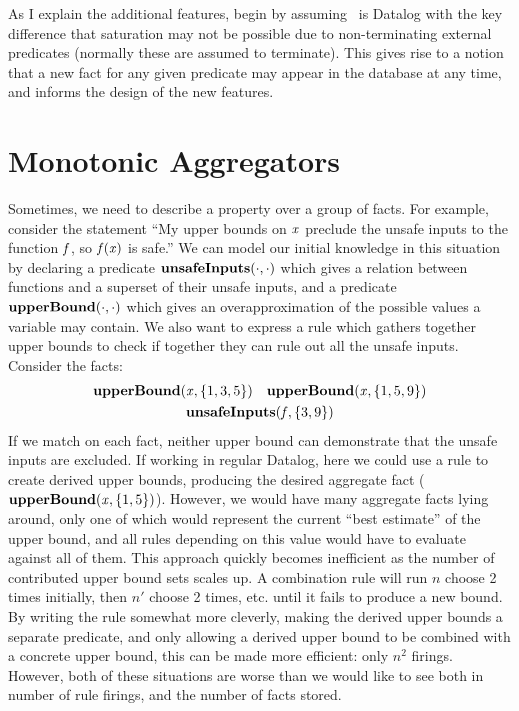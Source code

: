 As I explain the additional features, begin by assuming \sysname\ is Datalog with the key difference that saturation may not be possible due to non-terminating external predicates (normally these are assumed to terminate).
This gives rise to a notion that a new fact for any given predicate may appear in the database at any time, and informs the design of the new features.

\section{Monotonic Aggregators}
\label{sec:monagg}
Sometimes, we need to describe a property over a group of facts.
For example, consider the statement ``My upper bounds on ${\it x}$ preclude the unsafe inputs to the function ${\it f}$, so ${\it f}({\it x})$ is safe.''
We can model our initial knowledge in this situation by declaring a predicate ${\bf unsafeInputs}(\cdot, \cdot)$ which gives a relation between functions and a superset of their unsafe inputs, and a predicate ${\bf upperBound}(\cdot, \cdot)$ which gives an overapproximation of the possible values a variable may contain.
We also want to express a rule which gathers together upper bounds to check if together they can rule out all the unsafe inputs.
Consider the facts:
\begin{gather*}
  {\bf upperBound}({\it x}, \{1, 3, 5\}) \quad {\bf upperBound}({\it x}, \{1, 5, 9\})\\
  {\bf unsafeInputs}({\it f}, \{3, 9\})\\
\end{gather*}
If we match on each fact, neither upper bound can demonstrate that the unsafe inputs are excluded.
If working in regular Datalog, here we could use a rule to create derived upper bounds, producing the desired aggregate fact (${\bf upperBound}({\it x}, \{1, 5\})$).
However, we would have many aggregate facts lying around, only one of which would represent the current ``best estimate'' of the upper bound, and all rules depending on this value would have to evaluate against all of them.
This approach quickly becomes inefficient as the number of contributed upper bound sets scales up.
A combination rule will run $n$ choose 2 times initially, then $n'$ choose 2 times, etc. until it fails to produce a new bound.
By writing the rule somewhat more cleverly, making the derived upper bounds a separate predicate, and only allowing a derived upper bound to be combined with a concrete upper bound, this can be made more efficient: only $n^2$ firings.
However, both of these situations are worse than we would like to see both in number of rule firings, and the number of facts stored.

